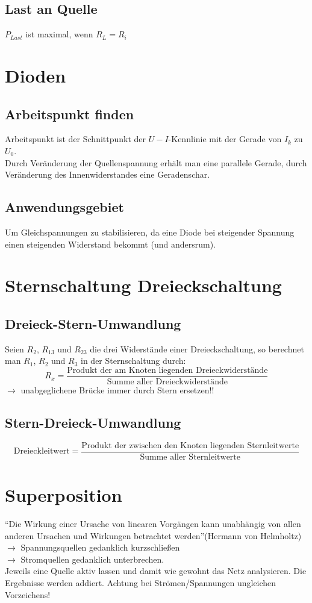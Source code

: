 \documentclass[12pt,a4paper]{article}
\begin{document}
\subsection{Last an Quelle}
$P_{Last}$ ist maximal, wenn $R_L = R_i$\\

\section{Dioden}
\subsection{Arbeitspunkt finden}
Arbeitspunkt ist der Schnittpunkt der $U-I$-Kennlinie mit der Gerade von $I_k$ zu $U_0$.\\
Durch Veränderung der Quellenspannung erhält man eine parallele Gerade, durch Veränderung des Innenwiderstandes eine Geradenschar.\\

\subsection{Anwendungsgebiet}
Um Gleichspannungen zu stabilisieren, da eine Diode bei steigender Spannung einen steigenden Widerstand bekommt (und andersrum).

\section{Sternschaltung Dreieckschaltung}
\subsection{Dreieck-Stern-Umwandlung}
Seien $R_{2}$, $R_{13}$ und $R_{23}$ die drei Widerstände einer Dreieckschaltung, so berechnet man $R_1$, $R_2$ und $R_3$ in der Sternschaltung durch: \\
\[R_{x} = \frac{\text{Produkt der am Knoten liegenden Dreieckwiderstände}}{\text{Summe aller Dreieckwiderstände}}\]
$\rightarrow$ unabgeglichene Brücke immer durch Stern ersetzen!!

\subsection{Stern-Dreieck-Umwandlung}
\[\text{Dreieckleitwert} = \frac{\text{Produkt der zwischen den Knoten liegenden Sternleitwerte}}{\text{Summe aller Sternleitwerte}}\]

\section{Superposition}
"`Die Wirkung einer Ursache von linearen Vorgängen kann unabhängig von allen anderen Ursachen und Wirkungen betrachtet werden"'(Hermann von Helmholtz)\\
$\rightarrow$ Spannungsquellen gedanklich kurzschließen \\
$\rightarrow$ Stromquellen gedanklich unterbrechen.\\
Jeweils eine Quelle aktiv lassen und damit wie gewohnt das Netz analysieren. Die Ergebnisse werden addiert. Achtung bei Strömen/Spannungen ungleichen Vorzeichens!
\end{document}
